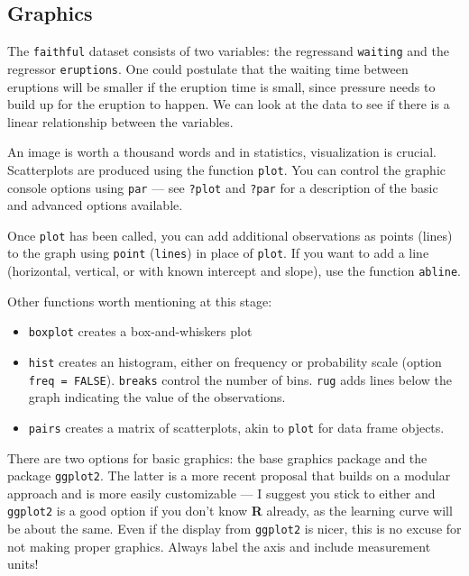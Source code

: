 \documentclass[]{book}
\providecommand{\tightlist}{%
  \setlength{\itemsep}{0pt}\setlength{\parskip}{0pt}}
\theoremstyle{definition}
\theoremstyle{definition}
\theoremstyle{definition}
\theoremstyle{remark}
\let\BeginKnitrBlock\begin \let\EndKnitrBlock\end
\begin{document}
\subsection{Graphics}\label{graphics}

The \texttt{faithful} dataset consists of two variables: the regressand
\texttt{waiting} and the regressor \texttt{eruptions}. One could
postulate that the waiting time between eruptions will be smaller if the
eruption time is small, since pressure needs to build up for the
eruption to happen. We can look at the data to see if there is a linear
relationship between the variables.

An image is worth a thousand words and in statistics, visualization is
crucial. Scatterplots are produced using the function \texttt{plot}. You
can control the graphic console options using \texttt{par} --- see
\texttt{?plot} and \texttt{?par} for a description of the basic and
advanced options available.

Once \texttt{plot} has been called, you can add additional observations
as points (lines) to the graph using \texttt{point} (\texttt{lines}) in
place of \texttt{plot}. If you want to add a line (horizontal, vertical,
or with known intercept and slope), use the function \texttt{abline}.

Other functions worth mentioning at this stage:

\begin{itemize}
\tightlist
\item
  \texttt{boxplot} creates a box-and-whiskers plot
\item
  \texttt{hist} creates an histogram, either on frequency or probability
  scale (option \texttt{freq\ =\ FALSE}). \texttt{breaks} control the
  number of bins. \texttt{rug} adds lines below the graph indicating the
  value of the observations.
\item
  \texttt{pairs} creates a matrix of scatterplots, akin to \texttt{plot}
  for data frame objects.
\end{itemize}

\BeginKnitrBlock{rmdnote}
There are two options for basic graphics: the base graphics package and
the package \texttt{ggplot2}. The latter is a more recent proposal that
builds on a modular approach and is more easily customizable --- I
suggest you stick to either and \texttt{ggplot2} is a good option if you
don't know \textbf{R} already, as the learning curve will be about the
same. Even if the display from \texttt{ggplot2} is nicer, this is no
excuse for not making proper graphics. Always label the axis and include
measurement units!
\EndKnitrBlock{rmdnote}
\end{document}
